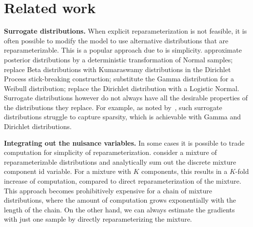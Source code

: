 \documentclass{article}
\begin{document}
\section{Related work}
\label{sect:related}

\textbf{Surrogate distributions.}
When explicit reparameterization is not feasible, it is often possible to modify the model to use alternative distributions that are reparameterizable. This is a popular approach due to is simplicity.
\citet{kucukelbir2017automatic} approximate posterior distributions by a deterministic transformation of Normal samples; \citet{nalisnick2016approximate,nalisnick2017stick} replace Beta distributions with Kumaraswamy distributions in the Dirichlet Process stick-breaking construction; \citet{zhang2018whai} substitute the Gamma distribution for a Weibull distribution; \citet{srivastava2017autoencoding,srivastava2018variational} replace the Dirichlet distribution with a Logistic Normal.
Surrogate distributions however do not always have all the desirable properties of the distributions they replace. For example, as noted by~\citet{ruiz2016generalized}, such surrogate distributions struggle to capture sparsity, which is achievable with Gamma and Dirichlet distributions.

\textbf{Integrating out the nuisance variables.}
In some cases it is possible to trade computation for simplicity of reparameterization.
\citet{roeder2017sticking} consider a mixture of reparameterizable distributions and analytically sum out the discrete mixture component id variable.
For a mixture with $K$ components, this results in a $K$-fold increase of computation, compared to direct reparameterization of the mixture.
This approach becomes prohibitively expensive for a chain of mixture distributions, where the amount of computation grows exponentially with the length of the chain.
On the other hand, we can always estimate the gradients with just one sample by directly reparameterizing the mixture.
\end{document}
